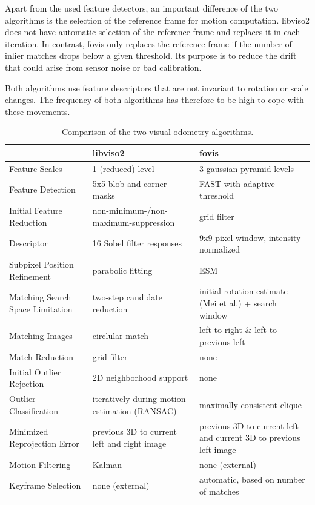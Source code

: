 \documentclass[conference]{IEEEtran}
\begin{document}
Apart from the used feature detectors, an important difference of the two algorithms is the selection of the reference frame for motion computation. libviso2 does not have automatic selection of the reference frame and replaces it in each iteration. In contrast, fovis only replaces the reference frame if the number of inlier matches drops below a given threshold. Its purpose is to reduce the drift that could arise from sensor noise or bad calibration.

Both algorithms use feature descriptors that are not invariant to rotation or scale changes. The frequency of both algorithms has therefore to be high to cope with these movements.

\begin{table}[ht]
  \caption{Comparison of the two visual odometry algorithms.}
  \label{odometry-comparison}
  \begin{tabularx}{\linewidth}{l|X|X}
    & \textbf{libviso2} & \textbf{fovis}  \\
    \hline
    Feature Scales                  & 1 (reduced) level & 3 gaussian pyramid levels \\[3pt]
    Feature Detection               & 5x5 blob and corner masks & FAST with adaptive threshold  \\[3pt]
    Initial Feature Reduction       & non-minimum-/non-maximum-suppression & grid filter \\[3pt]
    Descriptor                      & 16 Sobel filter responses & 9x9 pixel window, intensity normalized \\[3pt]
    Subpixel Position Refinement    & parabolic fitting & ESM \\[3pt]
    \hline
    Matching Search Space Limitation & two-step candidate reduction & initial rotation estimate (Mei et al.) + search window \\[3pt]
    Matching Images                 & circlular match & left to right \& left to previous left \\[3pt]
    Match Reduction                 & grid filter & none \\[3pt]
    \hline
    Initial Outlier Rejection       & 2D neighborhood support & none \\[3pt]
    Outlier Classification          & iteratively during motion estimation (RANSAC) & maximally consistent clique \\[3pt]
    Minimized Reprojection Error    & previous 3D to current left and right image & previous 3D to current left and current 3D to previous left image \\[3pt]
    \hline
    Motion Filtering                & Kalman & none (external) \\[3pt]
    Keyframe Selection              & none (external) & automatic, based on number of matches \\[3pt]
  \end{tabularx}
\end{table}
\end{document}
